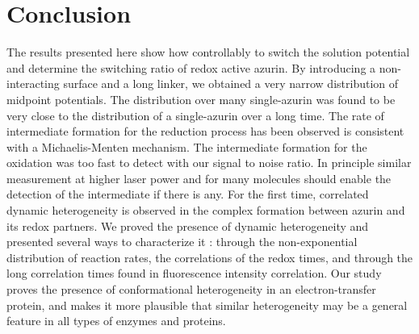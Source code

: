
\section{Conclusion}
The results presented here show how controllably to switch the solution potential and determine the switching ratio of redox active azurin.
By introducing a non-interacting surface and a long linker, we obtained a very narrow distribution of midpoint potentials.
The distribution over many single-azurin was found to be very close to the distribution of a single-azurin over a long time.
The rate of intermediate formation for the reduction process has been observed is consistent with a Michaelis-Menten mechanism.
The intermediate formation for the oxidation was too fast to detect with our signal to noise ratio.
In principle similar measurement at higher laser power and for many molecules should enable the detection of the intermediate if there is any.
For the first time, correlated dynamic heterogeneity is observed in the complex formation between azurin and its redox partners.
We proved the presence of dynamic heterogeneity and presented several ways to characterize it : through the non-exponential distribution of reaction rates, the correlations of the redox times, and through the long correlation times found in fluorescence intensity correlation.
Our study proves the presence of conformational heterogeneity in an electron-transfer protein, and makes it more plausible that similar heterogeneity may be a general feature in all types of enzymes and proteins.

